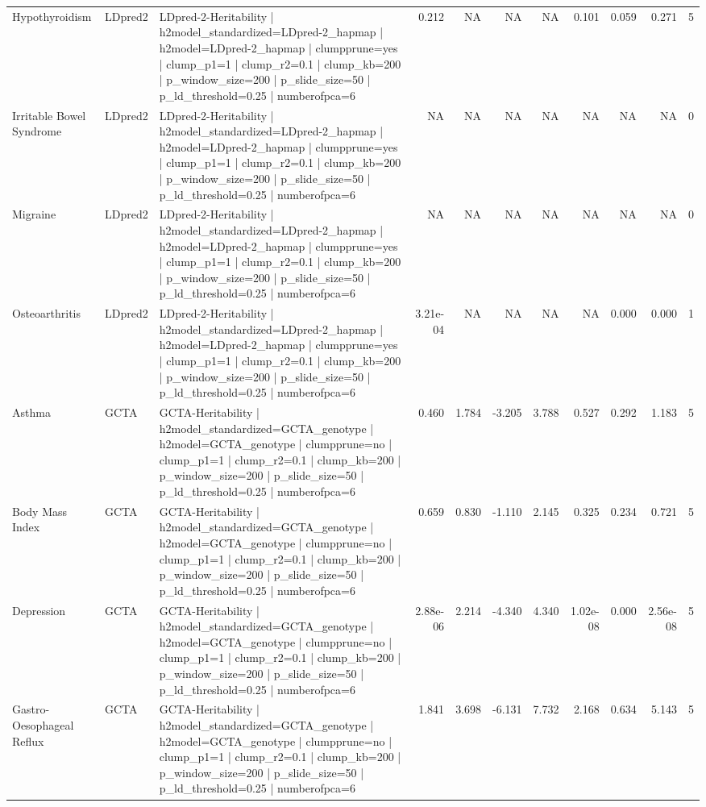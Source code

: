 \begin{landscape}
\begin{longtable}{p{2.4cm}p{1.8cm}p{6.0cm}rrrrrrrr}
Hypothyroidism & LDpred2 & LDpred-2-Heritability | h2model\_standardized=LDpred-2\_hapmap | h2model=LDpred-2\_hapmap | clumpprune=yes | clump\_p1=1 | clump\_r2=0.1 | clump\_kb=200 | p\_window\_size=200 | p\_slide\_size=50 | p\_ld\_threshold=0.25 | numberofpca=6 & 0.212 & NA & NA & NA & 0.101 & 0.059 & 0.271 & 5 \\
Irritable Bowel Syndrome & LDpred2 & LDpred-2-Heritability | h2model\_standardized=LDpred-2\_hapmap | h2model=LDpred-2\_hapmap | clumpprune=yes | clump\_p1=1 | clump\_r2=0.1 | clump\_kb=200 | p\_window\_size=200 | p\_slide\_size=50 | p\_ld\_threshold=0.25 | numberofpca=6 & NA & NA & NA & NA & NA & NA & NA & 0 \\
Migraine & LDpred2 & LDpred-2-Heritability | h2model\_standardized=LDpred-2\_hapmap | h2model=LDpred-2\_hapmap | clumpprune=yes | clump\_p1=1 | clump\_r2=0.1 | clump\_kb=200 | p\_window\_size=200 | p\_slide\_size=50 | p\_ld\_threshold=0.25 | numberofpca=6 & NA & NA & NA & NA & NA & NA & NA & 0 \\
Osteoarthritis & LDpred2 & LDpred-2-Heritability | h2model\_standardized=LDpred-2\_hapmap | h2model=LDpred-2\_hapmap | clumpprune=yes | clump\_p1=1 | clump\_r2=0.1 | clump\_kb=200 | p\_window\_size=200 | p\_slide\_size=50 | p\_ld\_threshold=0.25 | numberofpca=6 & 3.21e-04 & NA & NA & NA & NA & 0.000 & 0.000 & 1 \\
Asthma & GCTA & GCTA-Heritability | h2model\_standardized=GCTA\_genotype | h2model=GCTA\_genotype | clumpprune=no | clump\_p1=1 | clump\_r2=0.1 | clump\_kb=200 | p\_window\_size=200 | p\_slide\_size=50 | p\_ld\_threshold=0.25 | numberofpca=6 & 0.460 & 1.784 & -3.205 & 3.788 & 0.527 & 0.292 & 1.183 & 5 \\
Body Mass Index & GCTA & GCTA-Heritability | h2model\_standardized=GCTA\_genotype | h2model=GCTA\_genotype | clumpprune=no | clump\_p1=1 | clump\_r2=0.1 | clump\_kb=200 | p\_window\_size=200 | p\_slide\_size=50 | p\_ld\_threshold=0.25 | numberofpca=6 & 0.659 & 0.830 & -1.110 & 2.145 & 0.325 & 0.234 & 0.721 & 5 \\
Depression & GCTA & GCTA-Heritability | h2model\_standardized=GCTA\_genotype | h2model=GCTA\_genotype | clumpprune=no | clump\_p1=1 | clump\_r2=0.1 | clump\_kb=200 | p\_window\_size=200 | p\_slide\_size=50 | p\_ld\_threshold=0.25 | numberofpca=6 & 2.88e-06 & 2.214 & -4.340 & 4.340 & 1.02e-08 & 0.000 & 2.56e-08 & 5 \\
Gastro-Oesophageal Reflux & GCTA & GCTA-Heritability | h2model\_standardized=GCTA\_genotype | h2model=GCTA\_genotype | clumpprune=no | clump\_p1=1 | clump\_r2=0.1 | clump\_kb=200 | p\_window\_size=200 | p\_slide\_size=50 | p\_ld\_threshold=0.25 | numberofpca=6 & 1.841 & 3.698 & -6.131 & 7.732 & 2.168 & 0.634 & 5.143 & 5 \\

\end{longtable}
\end{landscape}
